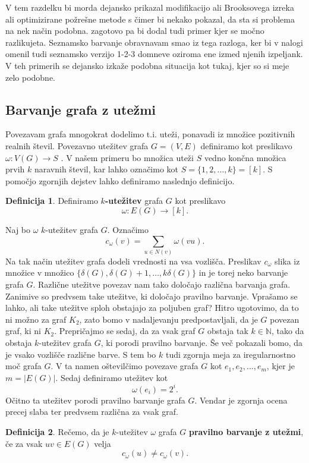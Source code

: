 \documentclass[12pt,a4paper,twoside]{article}
\theoremstyle{definition} %
\newtheorem{definicija}{Definicija}[section]
\theoremstyle{plain} %
\numberwithin{equation}{section}  %
\begin{document}
V tem razdelku bi morda dejansko prikazal modifikacijo ali Brooksovega izreka ali optimizirane požrešne metode s čimer bi nekako pokazal, da sta si problema na nek način podobna. zagotovo pa bi dodal tudi primer kjer se močno razlikujeta. Seznamsko barvanje obravnavam smao iz tega razloga, ker bi v nalogi omenil tudi seznamsko verzijo 1-2-3 domneve oziroma ene izmed njenih izpeljank. V teh primerih se dejansko izkaže podobna situacija kot tukaj, kjer so si meje zelo podobne.

\subsection{Barvanje grafa z utežmi}


Povezavam grafa mnogokrat dodelimo t.i. uteži, ponavadi iz množice pozitivnih realnih števil. Povezavno utežitev grafa $G=(V,E)$ definiramo kot preslikavo  $\omega : V(G) \rightarrow S$ . V našem primeru bo množica uteži $S$ vedno končna množica prvih $k$ naravnih števil, kar lahko označimo kot $S = \{1,2, \ldots, k\}= \left[k\right] $. S pomočjo zgornjih dejstev lahko definiramo naslednjo definicijo.
\begin{definicija}
	Definiramo \textbf{$k$-utežitev} grafa $G$ kot preslikavo 
	$$ \omega : E(G)  \rightarrow \left[k\right].$$	
\end{definicija}
Naj bo $\omega$ $k$-utežitev grafa $G$. Označimo
$$ c_{\omega} (v) = \sum_{u \in N(v)} \omega(vu). $$
Na tak način utežitev grafa dodeli vrednosti na vsa vozlišča. Preslikav $c_{\omega}$ slika iz množice v množico $\{ \delta(G),\delta(G) + 1, \ldots, k \delta(G)\}$ in je torej neko barvanje grafa $G$.
Različne utežitve povezav nam tako določajo različna barvanja grafa. Zanimive so predvsem take utežitve, ki določajo pravilno barvanje. Vprašamo se lahko, ali take utežitve sploh obstajajo za poljuben graf? Hitro ugotovimo, da to ni možno za graf $K_2$, zato bomo v nadaljevanju predpostavljali, da je $G$ povezan graf, ki ni $K_2$. Prepričajmo se sedaj, da za vsak graf $G$ obstaja tak $k \in \mathbb{N}$, tako da obstaja $k$-utežitev grafa $G$, ki porodi pravilno barvanje. Še več pokazali bomo, da je vsako vozlišče različne barve. S tem bo $k$ tudi zgornja meja za iregularnostno moč grafa $G$. V ta namen oštevilčimo povezave grafa $G$ kot $e_1, e_2, \ldots, e_m$, kjer je $m = |E(G)|$. Sedaj definiramo utežitev kot 
$$\omega(e_i) = 2 ^i .$$
Očitno ta utežitev porodi pravilno barvanje grafa $G$. Vendar je zgornja ocena precej slaba ter predvsem različna za vsak graf.
\begin{definicija}
	Rečemo, da je $k$-utežitev $\omega$ grafa $G$  \textbf{pravilno barvanje z utežmi}, če za vsak $uv \in E(G)$ velja
	$$c_{\omega} (u) \neq c_{\omega}(v). $$
\end{definicija}
\end{document}
